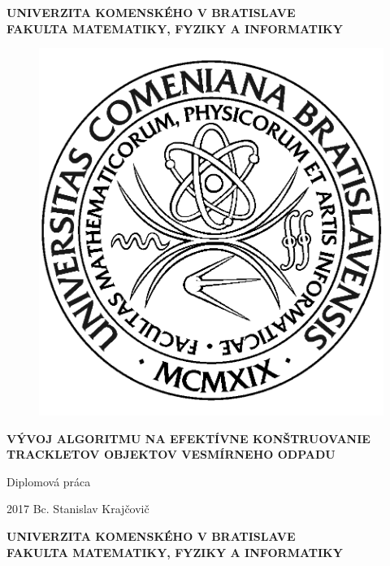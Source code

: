 \documentclass[12pt, a4paper, oneside]{book}
\newcommand\mftitle{Vývoj algoritmu na efektívne \protect konštruovanie trackletov objektov vesmírneho odpadu}
\newcommand\mfthesistype{Diplomová práca}
\newcommand\mfauthor{Bc. Stanislav Krajčovič}
\newcommand\mfuniversity{UNIVERZITA KOMENSKÉHO V BRATISLAVE}
\newcommand\mffaculty{FAKULTA MATEMATIKY, FYZIKY A INFORMATIKY}
\begin{document}
\frontmatter

\thispagestyle{empty}

\noindent
\begin{minipage}{\textwidth}
\begin{center}
\textbf{\mfuniversity \\
\mffaculty}
\end{center}
\end{minipage}

\vfill
\begin{figure}[!hbt]
	\begin{center}
		\includegraphics{images/logo_fmph}
		\label{img:logo}
	\end{center}
\end{figure}
\begin{center}
	\begin{minipage}{0.8\textwidth}
		\centerline{\textbf{\Large\MakeUppercase{\mftitle}}}
		\smallskip
		\centerline{\mfthesistype}
	\end{minipage}
\end{center}
\vfill
2017 \hfill
\mfauthor
\eject 

\thispagestyle{empty}

\noindent
\begin{minipage}{\textwidth}
\begin{center}
\textbf{\mfuniversity \\
\mffaculty}
\end{center}
\end{minipage}
\end{document}
